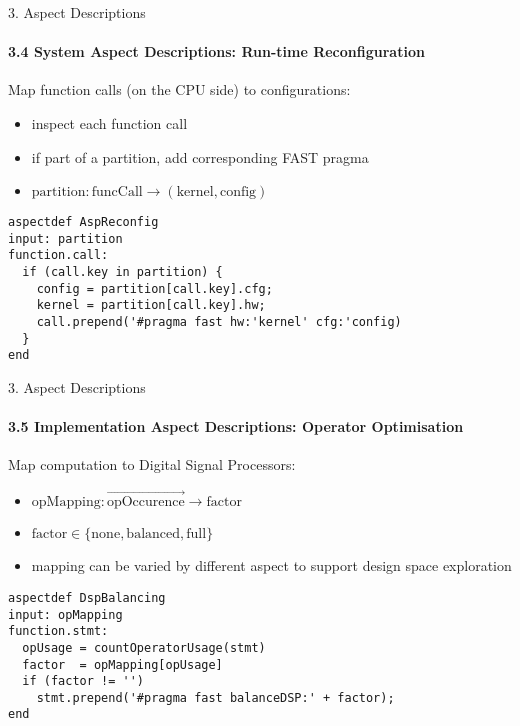 \begin{frame}[fragile]{3. Aspect Descriptions}
  \framesubtitle{3.4 System Aspect Descriptions: Run-time Reconfiguration}
  Map function calls (on the CPU side) to configurations:
  \begin{itemize}
  \item inspect each function call
  \item if part of a partition, add corresponding FAST pragma
  \item $ \text{partition} : \text{funcCall} \rightarrow (\text{kernel}, \text{config}) $
  \end{itemize}

  \begin{lstlisting}[style=lara]
aspectdef AspReconfig
input: partition
function.call:
  if (call.key in partition) {
    config = partition[call.key].cfg;
    kernel = partition[call.key].hw;
    call.prepend('#pragma fast hw:'kernel' cfg:'config)
  }
end
  \end{lstlisting}
\end{frame}

\begin{frame}[fragile]{3. Aspect Descriptions}
  \framesubtitle{3.5 Implementation Aspect Descriptions: Operator Optimisation}
  Map computation to Digital Signal Processors:
  \begin{itemize}
  \item $ \text{opMapping} : \overrightarrow{\text{opOccurence}} \rightarrow \text{factor}$
  \item $\text{factor} \in \{\text{none}, \text{balanced}, \text{full}\} $
  \item mapping can be varied by different aspect to support design
    space exploration
  \end{itemize}
  \begin{lstlisting}[label=lst:label, style=lara]
aspectdef DspBalancing
input: opMapping
function.stmt:
  opUsage = countOperatorUsage(stmt)
  factor  = opMapping[opUsage]
  if (factor != '')
    stmt.prepend('#pragma fast balanceDSP:' + factor);
end
  \end{lstlisting}
\end{frame}

